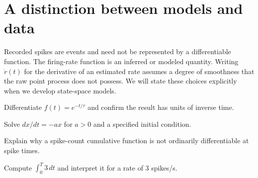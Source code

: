 \section{A distinction between models and data}
Recorded spikes are events and need not be represented by a differentiable function. The firing-rate function is an inferred or modeled quantity. Writing $\dot r(t)$ for the derivative of an estimated rate assumes a degree of smoothness that the raw point process does not possess. We will state these choices explicitly when we develop state-space models.

\begin{exercises}
\item Differentiate $f(t)=e^{-t/\tau}$ and confirm the result has units of inverse time.
\item Solve $dx/dt=-ax$ for $a>0$ and a specified initial condition.
\item Explain why a spike-count cumulative function is not ordinarily differentiable at spike times.
\item Compute $\int_0^T 3\,dt$ and interpret it for a rate of 3 spikes/s.
\end{exercises}